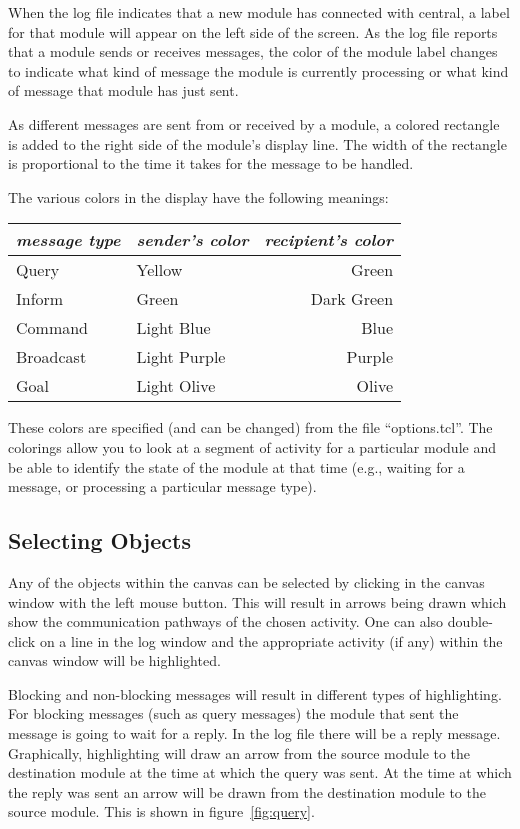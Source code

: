 When the log file indicates that a new module has connected with central,
a label for that module 
will appear on the left side of the screen. As the log file reports that a
module sends or receives messages, the color of the module label changes
to indicate 
what kind of message the module is currently processing or what kind
of message that module has just sent.

As different messages are sent from or received by a module, a colored
rectangle is added to the right side of the module's display line. The
width of the rectangle is proportional to the time it takes for the message to
be handled.

The various colors in the display have the following meanings:

\begin{center}
\begin{tabular}{|l|l|r|} \hline
{\em message type}	& {\em sender's color}	
				& {\em recipient's color} \\ \hline
Query		& Yellow		& Green \\
Inform		& Green			& Dark Green \\
Command		& Light Blue		& Blue \\
Broadcast	& Light Purple		& Purple \\
Goal		& Light Olive		& Olive \\ \hline
\end{tabular}
\end{center}

These colors are specified (and can be changed) from the file
``options.tcl''. The colorings allow you to look at a segment of activity
for a particular module and be able to identify the state of the
module at that time (e.g., waiting for a message, or processing a
particular message type).

\subsection{Selecting Objects}

Any of the objects within the canvas can be selected by clicking in
the canvas window with the left mouse button. This will result in
arrows being drawn which show the communication pathways of the chosen
activity. One can also double-click on a line in the log window and
the appropriate activity (if any) within the canvas window will be
highlighted.

Blocking and non-blocking messages will result in different types
of highlighting.
For blocking messages (such as query messages) the module that sent
the message is going to wait for a reply. In the log file there will
be a reply message. Graphically, highlighting will draw an arrow from
the source module to the destination module at the time at which the
query was sent. At the time at which the reply was sent an arrow will
be drawn from the destination module to the source module. This is
shown in figure~\ref{fig:query}.

